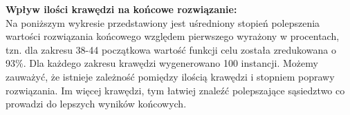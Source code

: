 \documentclass{article}
\begin{document}
\large\textbf{Wpływ ilości krawędzi na końcowe rozwiązanie:}\normalsize\\
Na poniższym wykresie przedstawiony jest uśredniony stopień polepszenia
wartości rozwiązania końcowego względem pierwszego wyrażony w procentach,
tzn. dla zakresu 38-44 początkowa wartość funkcji celu została zredukowana
o 93\%. Dla każdego zakresu krawędzi wygenerowano 100 instancji. Możemy
zauważyć, że istnieje zależność pomiędzy ilością krawędzi i stopniem poprawy
rozwiązania. Im więcej krawędzi, tym łatwiej znaleźć polepszające sąsiedztwo
co prowadzi do lepszych wyników końcowych.

\begin{center}
\end{center}


\begin{center}
\end{center}
\end{document}
